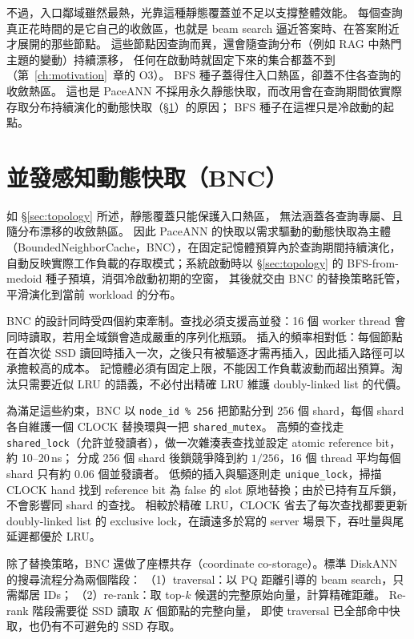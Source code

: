 不過，入口鄰域雖然最熱，光靠這種靜態覆蓋並不足以支撐整體效能。
每個查詢真正花時間的是它自己的收斂區，也就是 beam search 逼近答案時、在答案附近才展開的那些節點。
這些節點因查詢而異，還會隨查詢分布（例如 RAG 中熱門主題的變動）持續漂移，
任何在啟動時就固定下來的集合都蓋不到（第~\ref{ch:motivation}~章的 O3）。
BFS 種子蓋得住入口熱區，卻蓋不住各查詢的收斂熱區。
這也是 PaceANN 不採用永久靜態快取，而改用會在查詢期間依實際存取分布持續演化的動態快取（§\ref{sec:cache}）的原因；
BFS 種子在這裡只是冷啟動的起點。

\section{並發感知動態快取（BNC）}
\label{sec:cache}

如 §\ref{sec:topology} 所述，靜態覆蓋只能保護入口熱區，
無法涵蓋各查詢專屬、且隨分布漂移的收斂熱區。
因此 PaceANN 的快取以需求驅動的動態快取為主體（BoundedNeighborCache，BNC），在固定記憶體預算內於查詢期間持續演化，
自動反映實際工作負載的存取模式；系統啟動時以 §\ref{sec:topology} 的 BFS-from-medoid 種子預填，消弭冷啟動初期的空窗，
其後就交由 BNC 的替換策略託管，平滑演化到當前 workload 的分布。

BNC 的設計同時受四個約束牽制。查找必須支援高並發：16 個 worker thread 會同時讀取，若用全域鎖會造成嚴重的序列化瓶頸。
插入的頻率相對低：每個節點在首次從 SSD 讀回時插入一次，之後只有被驅逐才需再插入，因此插入路徑可以承擔較高的成本。
記憶體必須有固定上限，不能因工作負載波動而超出預算。淘汰只需要近似 LRU 的語義，不必付出精確 LRU 維護 doubly-linked list 的代價。

為滿足這些約束，BNC 以 \texttt{node\_id \% 256} 把節點分到 256 個 shard，每個 shard 各自維護一個 CLOCK 替換環與一把 \texttt{shared\_mutex}。
高頻的查找走 \texttt{shared\_lock}（允許並發讀者），做一次雜湊表查找並設定 atomic reference bit，約 10--20\,ns；
分成 256 個 shard 後鎖競爭降到約 $1/256$，16 個 thread 平均每個 shard 只有約 0.06 個並發讀者。
低頻的插入與驅逐則走 \texttt{unique\_lock}，掃描 CLOCK hand 找到 reference bit 為 false 的 slot 原地替換；由於已持有互斥鎖，不會影響同 shard 的查找。
相較於精確 LRU，CLOCK 省去了每次查找都要更新 doubly-linked list 的 exclusive lock，在讀遠多於寫的 server 場景下，吞吐量與尾延遲都優於 LRU。

除了替換策略，BNC 還做了座標共存（coordinate co-storage）。標準 DiskANN 的搜尋流程分為兩個階段：
（1）traversal：以 PQ 距離引導的 beam search，只需鄰居 IDs；
（2）re-rank：取 top-$k$ 候選的完整原始向量，計算精確距離。
Re-rank 階段需要從 SSD 讀取 $K$ 個節點的完整向量，
即使 traversal 已全部命中快取，也仍有不可避免的 SSD 存取。

